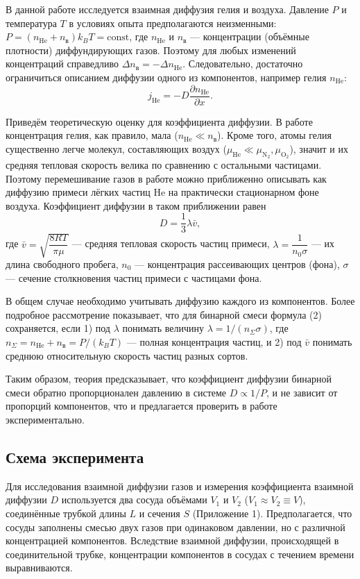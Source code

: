 \documentclass[a4paper]{article}
\begin{document}
	В данной работе исследуется взаимная диффузия гелия и воздуха. Давление $P$ и температура $T$ в условиях опыта предполагаются неизменными: $P = (n_{\text{He}} + n_{\text{в}})k_B T = \text{const}$, где $n_{\text{He}}$ и $n_{\text{в}}$ — концентрации (объёмные плотности) диффундирующих газов. Поэтому для любых изменений концентраций справедливо $\Delta n_{\text{в}} = -\Delta n_{\text{He}}$. Следовательно, достаточно ограничиться описанием диффузии одного из компонентов, например гелия $n_{\text{He}}$:
	\begin{equation} \label{eq:Fick}
		j_{\text{He}} = -D \frac{\partial n_{\text{He}}}{\partial x}. \tag{1}
	\end{equation}
	
	Приведём теоретическую оценку для коэффициента диффузии. В работе концентрация гелия, как правило, мала ($n_{\text{He}} \ll n_{\text{в}}$). Кроме того, атомы гелия существенно легче молекул, составляющих воздух ($\mu_{\text{He}} \ll \mu_{\text{N}_2}, \mu_{\text{O}_2}$), значит и их средняя тепловая скорость велика по сравнению с остальными частицами. Поэтому перемешивание газов в работе можно приближенно описывать как диффузию примеси лёгких частиц He на практически стационарном фоне воздуха. Коэффициент диффузии в таком приближении равен
	\begin{equation} \label{eq:Dtheory}
		D = \frac{1}{3} \lambda \bar{v}, \tag{2}
	\end{equation}
	где $\bar{v} = \sqrt{\dfrac{8RT}{\pi\mu}}$ — средняя тепловая скорость частиц примеси, $\lambda = \dfrac{1}{n_0\sigma}$ — их длина свободного пробега, $n_0$ — концентрация рассеивающих центров (фона), $\sigma$ — сечение столкновения частиц примеси с частицами фона.
	
	В общем случае необходимо учитывать диффузию каждого из компонентов. Более подробное рассмотрение показывает, что для бинарной смеси формула (2) сохраняется, если 1) под $\lambda$ понимать величину $\lambda = 1/(n_\Sigma \sigma)$, где $n_\Sigma = n_{\text{He}} + n_{\text{в}} = P/(k_B T)$ — полная концентрация частиц, и 2) под $\bar{v}$ понимать среднюю относительную скорость частиц разных сортов.
	
	Таким образом, теория предсказывает, что коэффициент диффузии бинарной смеси обратно пропорционален давлению в системе $D \propto 1/P$, и не зависит от пропорций компонентов, что и предлагается проверить в работе экспериментально.
	
	\subsection{Схема эксперимента}
	Для исследования взаимной диффузии газов и измерения коэффициента взаимной диффузии $D$ используется два сосуда объёмами $V_1$ и $V_2$ ($V_1 \approx V_2 \equiv V$), соединённые трубкой длины $L$ и сечения $S$ (Приложение 1). Предполагается, что сосуды заполнены смесью двух газов при одинаковом давлении, но с различной концентрацией компонентов. Вследствие взаимной диффузии, происходящей в соединительной трубке, концентрации компонентов в сосудах с течением времени выравниваются.
	
\end{document}
